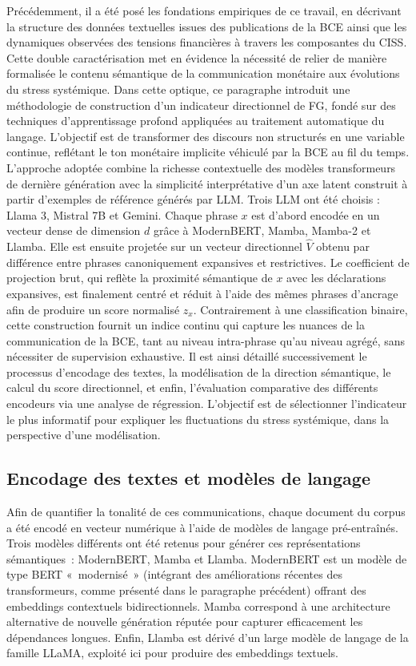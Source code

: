 Précédemment, il a été posé les fondations empiriques de ce travail, en décrivant la structure des données textuelles issues des publications de la BCE ainsi que les dynamiques observées des tensions financières à travers les composantes du CISS. Cette double caractérisation met en évidence la nécessité de relier de manière formalisée le contenu sémantique de la communication monétaire aux évolutions du stress systémique. Dans cette optique, ce paragraphe introduit une méthodologie de construction d’un indicateur directionnel de FG, fondé sur des techniques d’apprentissage profond appliquées au traitement automatique du langage. L’objectif est de transformer des discours non structurés en une variable continue, reflétant le ton monétaire implicite véhiculé par la BCE au fil du temps. L’approche adoptée combine la richesse contextuelle des modèles transformeurs de dernière génération avec la simplicité interprétative d’un axe latent construit à partir d’exemples de référence générés par LLM. Trois LLM ont été choisis : Llama 3, Mistral 7B et Gemini. Chaque phrase $x$ est d’abord encodée en un vecteur dense de dimension $d$ grâce à ModernBERT, Mamba, Mamba-2 et Llamba. Elle est ensuite projetée sur un vecteur directionnel $\hat V$ obtenu par différence entre phrases canoniquement expansives et restrictives. Le coefficient de projection brut, qui reflète la proximité sémantique de $x$ avec les déclarations expansives, est finalement centré et réduit à l’aide des mêmes phrases d’ancrage afin de produire un score normalisé $z_x$.  Contrairement à une classification binaire, cette
construction fournit un indice continu qui capture les nuances de la communication de la BCE, tant au niveau intra-phrase qu’au niveau agrégé, sans nécessiter de supervision exhaustive. Il est ainsi détaillé successivement le processus d’encodage des textes, la modélisation de la direction sémantique, le calcul du score directionnel, et enfin, l’évaluation comparative des différents encodeurs via une analyse de régression. L’objectif est de sélectionner l’indicateur le plus informatif pour expliquer les fluctuations du stress systémique, dans la perspective d’une modélisation.

\newpage

\subsection{Encodage des textes et modèles de langage}

Afin de quantifier la tonalité de ces communications, chaque document du corpus a été encodé en vecteur numérique à l’aide de modèles de langage pré-entraînés. Trois modèles différents ont été retenus pour générer ces représentations sémantiques : ModernBERT, Mamba et Llamba. ModernBERT est un modèle de type BERT « modernisé » (intégrant des améliorations récentes des transformeurs, comme présenté dans le paragraphe précédent) offrant des embeddings contextuels bidirectionnels. Mamba correspond à une architecture alternative de nouvelle génération réputée pour capturer efficacement les dépendances longues. Enfin, Llamba est dérivé d’un large modèle de langage de la famille LLaMA, exploité ici pour produire des embeddings textuels.\\

